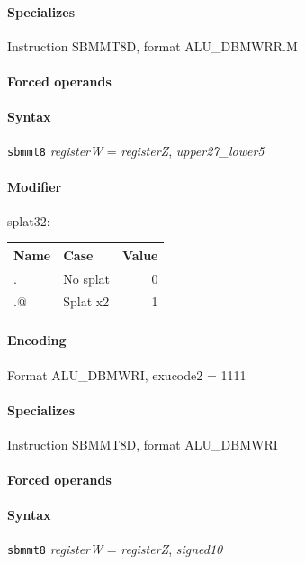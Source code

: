 {\paragraph{Specializes} Instruction SBMMT8D, format ALU\_DBMWRR.M

\paragraph{Forced operands} 

\paragraph{Syntax} \texttt{sbmmt8} \emph{registerW} = \emph{registerZ}, \emph{upper27\_lower5}

\paragraph{Modifier} \textsf{splat32}:\\

\noindent \begin{tabular}{|l|l|r|} \hline
\bf{Name} & \bf{Case} & \bf{Value} \\ \hline
. & No splat & 0 \\
.@ & Splat x2 & 1 \\
\hline \end{tabular}

\paragraph{Encoding} Format \textsf{ALU\_DBMWRI, exucode2 = 1111}\\



\paragraph{Specializes} Instruction SBMMT8D, format ALU\_DBMWRI

\paragraph{Forced operands} 

\paragraph{Syntax} \texttt{sbmmt8} \emph{registerW} = \emph{registerZ}, \emph{signed10}

}
